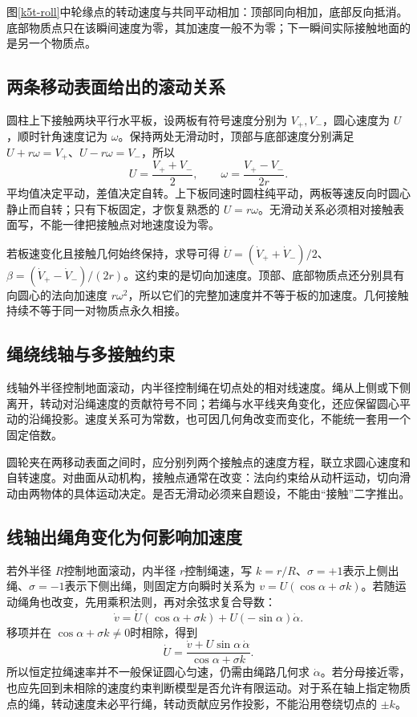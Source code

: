 图\ref{k5t-roll}中轮缘点的转动速度与共同平动相加：顶部同向相加，底部反向抵消。底部物质点只在该瞬间速度为零，其加速度一般不为零；下一瞬间实际接触地面的是另一个物质点。


\subsection{两条移动表面给出的滚动关系}
圆柱上下接触两块平行水平板，设两板有符号速度分别为 $V_+,V_-$，圆心速度为 $U$，顺时针角速度记为 $\omega$。保持两处无滑动时，顶部与底部速度分别满足 $U+r\omega=V_+$、$U-r\omega=V_-$，所以
\[U=\frac{V_++V_-}{2},\qquad \omega=\frac{V_+-V_-}{2r}.
\]
平均值决定平动，差值决定自转。上下板同速时圆柱纯平动，两板等速反向时圆心静止而自转；只有下板固定，才恢复熟悉的 $U=r\omega$。无滑动关系必须相对接触表面写，不能一律把接触点对地速度设为零。

若板速变化且接触几何始终保持，求导可得 $\dot U=(\dot V_++\dot V_-)/2$、$\beta=(\dot V_+-\dot V_-)/(2r)$。这约束的是切向加速度。顶部、底部物质点还分别具有向圆心的法向加速度 $r\omega^2$，所以它们的完整加速度并不等于板的加速度。几何接触持续不等于同一对物质点永久相接。



\subsection{绳绕线轴与多接触约束}
线轴外半径控制地面滚动，内半径控制绳在切点处的相对线速度。绳从上侧或下侧离开，转动对沿绳速度的贡献符号不同；若绳与水平线夹角变化，还应保留圆心平动的沿绳投影。速度关系可为常数，也可因几何角改变而变化，不能统一套用一个固定倍数。

圆轮夹在两移动表面之间时，应分别列两个接触点的速度方程，联立求圆心速度和自转速度。对曲面从动机构，接触点通常在改变：法向约束给从动杆运动，切向滑动由两物体的具体运动决定。是否无滑动必须来自题设，不能由“接触”二字推出。
\subsection{线轴出绳角变化为何影响加速度}
若外半径 $R$控制地面滚动，内半径 $r$控制绳速，写 $k=r/R$、$\sigma=+1$表示上侧出绳、$\sigma=-1$表示下侧出绳，则固定方向瞬时关系为 $v=U(\cos\alpha+\sigma k)$。若随运动绳角也改变，先用乘积法则，再对余弦求复合导数：
\[\dot v=\dot U(\cos\alpha+\sigma k)+U(-\sin\alpha)\dot\alpha.\]
移项并在 $\cos\alpha+\sigma k\ne0$时相除，得到
\[\dot U=\frac{\dot v+U\sin\alpha\,\dot\alpha}{\cos\alpha+\sigma k}.
\]
所以恒定拉绳速率并不一般保证圆心匀速，仍需由绳路几何求 $\dot\alpha$。若分母接近零，也应先回到未相除的速度约束判断模型是否允许有限运动。对于系在轴上指定物质点的绳，转动速度未必平行绳，转动贡献应另作投影，不能沿用卷绕切点的 $\pm k$。


